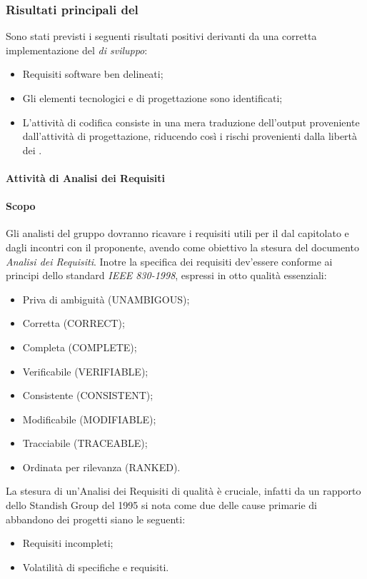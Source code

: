         \subsubsection{Risultati principali del }
        Sono stati previsti i seguenti risultati positivi derivanti da una corretta implementazione del \textit{ di sviluppo}:
        \begin{itemize}
          \item Requisiti software ben delineati;
          \item Gli elementi tecnologici e di progettazione sono identificati;
          \item L'attivit\`a di codifica consiste in una mera traduzione dell'output proveniente dall'attivit\`a di progettazione,
            riducendo cos\`i i rischi provenienti dalla libert\`a dei .
        \end{itemize}
        
		\paragraph*{Attività di Analisi dei Requisiti}
			\paragraph*{Scopo}
				Gli analisti del gruppo dovranno ricavare i requisiti utili per il 
				dal capitolato e dagli incontri con il proponente, avendo come obiettivo la
				stesura del documento \textit{Analisi dei Requisiti}.
			        Inotre la specifica dei requisiti dev'essere conforme ai principi dello standard \textit{IEEE 830-1998}, espressi in otto qualit\`a
			        essenziali:
				\begin{itemize}
				\item Priva di ambiguit\`a (UNAMBIGOUS);
				\item Corretta (CORRECT);
				\item Completa (COMPLETE);
				\item Verificabile (VERIFIABLE);
				\item Consistente (CONSISTENT);
				\item Modificabile (MODIFIABLE);
				\item Tracciabile (TRACEABLE);
				\item Ordinata per rilevanza (RANKED).
				\end{itemize}
			        La stesura di un'Analisi dei Requisiti di qualit\`a \`e cruciale, infatti
			        da un rapporto dello Standish Group del 1995 si nota come due delle cause primarie
			        di abbandono dei progetti siano le seguenti:
				\begin{itemize}
				\item Requisiti incompleti;
				\item Volatilità di specifiche e requisiti.
				\end{itemize}
			
